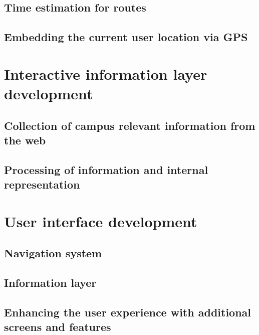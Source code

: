 \subsection{Time estimation for routes}
\subsection{Embedding the current user location via GPS}

\section{Interactive information layer development}
\subsection{Collection of campus relevant information from the web}
\subsection{Processing of information and internal representation}

\section{User interface development}
\subsection{Navigation system}
\subsection{Information layer}
\subsection{Enhancing the user experience with additional screens and features}
